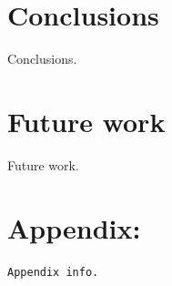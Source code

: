 \documentclass[11pt, twocolumn]{article}
\begin{document}
\section{Conclusions}
\label{sec:conc}
Conclusions.

\section{Future work}
\label{sec:future}
Future work. \cite{tmn}





\newpage
\begin{appendix} \label{appendix}
\section*{Appendix:}
{\tiny
\begin{verbatim}
Appendix info.
\end{verbatim}
}
\end{appendix}
\end{document}
